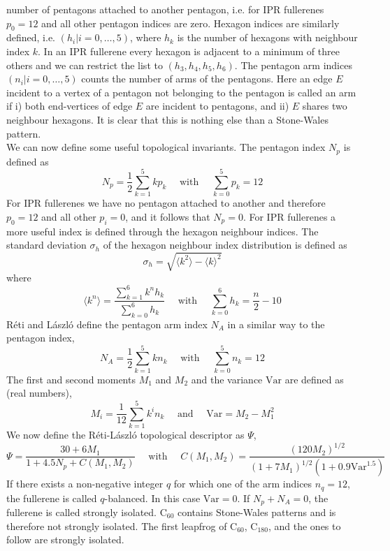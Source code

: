 \documentclass[article,a4paper,twoside]{memoir}
\newcommand{\C}[1]{\ensuremath{\mathrm{C}_{#1}}}
\begin{document}
number of pentagons attached to another pentagon, i.e. for IPR fullerenes $p_0 = 12$ and all other pentagon indices are zero. Hexagon indices are similarly
defined, i.e. $(h_i | i=0, \dots , 5)$, where $h_k$ is the number of hexagons with neighbour index $k$. In an IPR fullerene every hexagon is adjacent to a
minimum of three others and we can restrict the list to $(h_3, h_4, h_5, h_6)$. The pentagon arm indices $(n_i | i=0, \dots , 5)$ counts the number of arms
of the pentagons. Here an edge $E$ incident to a vertex of a pentagon not belonging to the pentagon is called an arm if i) both end-vertices of edge $E$ 
are incident to pentagons, and ii) $E$ shares two neighbour hexagons.\cite{Reti} It is clear that this is nothing else than a Stone-Wales pattern.\\
We can now define some useful topological invariants. The pentagon index $N_p$ is defined as
\begin{equation}
  \label{pentindex}
  N_p = \frac{1}{2}\sum_{k=1}^{5} kp_k \quad \text{ with } \quad  \sum_{k=0}^{5} p_k = 12
\end{equation}
For IPR fullerenes we have no pentagon attached to another and therefore $p_0 = 12$ and all other $p_i = 0$, and it follows that $N_p = 0$. For IPR fullerenes
a more useful index is defined through the hexagon neighbour indices. The standard deviation $\sigma_h$ of the hexagon neighbour index distribution is defined as
\begin{equation}
  \label{standev}
  \sigma_h = \sqrt{\langle k^2 \rangle - \langle k \rangle^2}
\end{equation}
where
\begin{equation}
  \label{mean}
  \langle k^n \rangle = \frac{\sum_{k=1}^{6} k^n h_k}{\sum_{k=0}^{6} h_k}  \quad \text{ with } \quad  \sum_{k=0}^{6} h_k = \frac{n}{2} - 10
\end{equation}
R\'eti and L\'aszl\'o define the pentagon arm index $N_A$ in a similar way to the pentagon index,\cite{Reti}
\begin{equation}
  \label{arms}
  N_A = \frac{1}{2}\sum_{k=1}^{5} kn_k  \quad \text{ with } \quad  \sum_{k=0}^{5} n_k = 12
\end{equation}
The first and second moments $M_1$ and $M_2$ and the variance $\text{Var}$ are defined as (real numbers),
\begin{equation}
  \label{Moments}
  M_i = \frac{1}{12}\sum_{k=1}^{5} k^i n_k  \quad \text{ and } \quad  \text{Var}= M_2 - M_1^2
\end{equation}
We now define the R\'eti-L\'aszl\'o topological descriptor as $\Psi$,
\begin{equation}
  \label{Moments}
  \Psi = \frac{30+6M_1}{1+4.5N_p+C(M_1,M_2)} \quad \text{ with } \quad  C(M_1,M_2) = \frac{(120M_2)^{1/2}}{(1+7M_1)^{1/2}(1+0.9\text{Var}^{1.5})}
\end{equation}
If there exists a non-negative integer $q$ for which one of the arm indices $n_q = 12$, the fullerene is called $q$-balanced. In this
case $\text{Var} = 0$.\cite{Reti} If $N_p + N_A = 0$, the fullerene is called strongly isolated. \C{60} contains Stone-Wales patterns and is therefore not
strongly isolated. The first leapfrog of \C{60}, \C{180}, and the ones to follow are strongly isolated.
\end{document}
